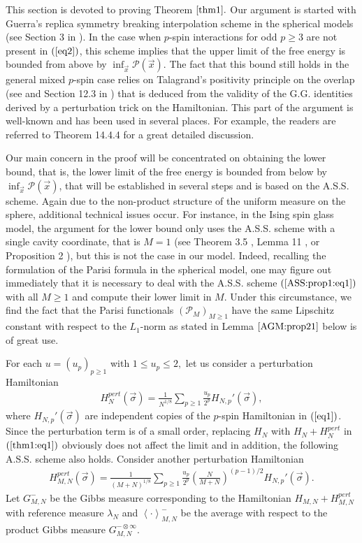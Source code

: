 \documentclass[12pt]{article}
\newcommand{\vsi}{{\vec{\sigma}}}
\newcommand{\vx}{\vec{x}}
\newenvironment{Proof of lemma}{\noindent{\bf Proof of Lemma}}{\hfill$\Box$\newline}
\newenvironment{Proof of theorem}{\noindent{\bf Proof of Theorem}}{\hfill{\footnotesize${\square}$}\newline}
\newenvironment{Proof of theorems}{\noindent{\bf Proof of Theorems}}{\hfill$\Box$\newline}
\newenvironment{Proof of proposition}{\noindent{\bf Proof of Proposition}}{\hfill$\Box$\newline}
\newenvironment{Proof of propositions}{\noindent{\bf Proof of Propositions}}{\hfill$\Box$\newline}
\newenvironment{Proof of exercise}{\noindent{\it Proof of Exercise:}}{\hfill$\Box$}
\numberwithin{equation}{section}
\begin{document}
\noindent This section is devoted to proving Theorem $\ref{thm1}.$ Our argument is started with Guerra's replica symmetry breaking interpolation scheme in the spherical models (see Section 3 in \cite{Tal061}). In the case when $p$-spin interactions for odd $p\geq 3$ are not present in $(\ref{eq2})$, this scheme implies that the upper limit of the free energy is bounded from above by $\inf_{\vx}\mathcal{P}(\vx).$ The fact that this bound still holds in the general mixed $p$-spin case relies on Talagrand's positivity principle on the overlap (see \cite{Tal03} and Section 12.3 in \cite{Tal11}) that is deduced from the validity of the G.G. identities \cite{GG98} derived by a perturbation trick on the Hamiltonian. This part of the argument is well-known and has been used in several places. For example, the readers are referred to Theorem 14.4.4 \cite{Tal11} for a great detailed discussion.

Our main concern in the proof will be concentrated on obtaining the lower bound, that is, the lower limit of the free energy is bounded from below by
$\inf_{\vx}\mathcal{P}(\vx)$, that will be established in several steps and is based on the A.S.S. scheme. Again due to the non-product structure of the uniform measure on the sphere, additional technical issues occur. For instance, in the Ising spin glass model, the argument for the lower bound only uses the A.S.S. scheme with a single cavity coordinate, that is $M=1$ (see Theorem 3.5 \cite{AC10}, Lemma 11 \cite{Pan10:2}, or Proposition 2 \cite{Pan11:1}), but this is not the case in our model. Indeed, recalling the formulation of the Parisi formula in the spherical model, one may figure out immediately that it is necessary to deal with the A.S.S. scheme $(\ref{ASS:prop1:eq1})$ with all $M\geq 1$ and compute their lower limit in $M.$ Under this circumstance, we find the fact that the Parisi functionals $(\mathcal{P}_M)_{M\geq 1}$ have the same Lipschitz constant with respect to the $L_1$-norm as stated in Lemma $\ref{AGM:prop21}$ below is of great use. 
\smallskip

 For each $u=(u_p)_{p\geq 1}$ with $1\leq u_p\leq 2,$ let us consider a perturbation Hamiltonian 
\begin{align*}
H_{N}^{pert}(\vsi)=\frac{1}{N^{1/8}}\sum_{p\geq 1}\frac{u_p}{2^p}H_{N,p}'(\vsi),
\end{align*}
where $H_{N,p}'(\vsi)$ are independent copies of the $p$-spin Hamiltonian in $(\ref{eq1})$. Since the perturbation term is of a small order, replacing $H_N$ with $H_N+H_N^{pert}$ in $(\ref{thm1:eq1})$ obviously does not affect the limit and in addition, the following A.S.S. scheme also holds. 
Consider another perturbation Hamiltonian
\begin{align*}
H_{M,N}^{pert}(\vsi)=\frac{1}{(M+N)^{1/8}}\sum_{p\geq 1}\frac{u_p}{2^p}\left(\frac{N}{M+N}\right)^{(p-1)/2}H_{N,p}'(\vsi).
\end{align*}
Let $G_{M,N}^-$ be the Gibbs measure corresponding to the Hamiltonian $H_{M,N}+H_{M,N}^{pert}$ with reference measure $\lambda_N$ and $\left<\cdot\right>_{M,N}^-$ be the average with respect to the product Gibbs measure $G_{M,N}^{-\otimes\infty}.$
\end{document}
